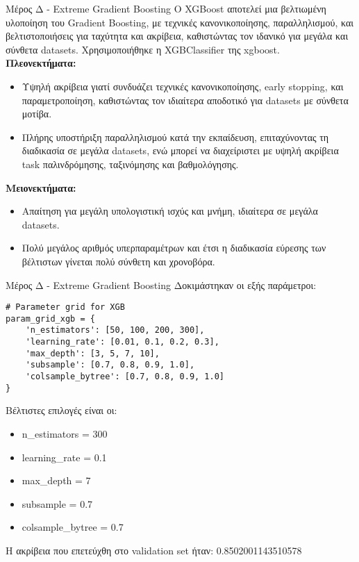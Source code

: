 \documentclass{beamer}
\begin{document}
\begin{frame}[fragile]{Μέρος Δ - Extreme Gradient Boosting}
Ο XGBoost αποτελεί μια βελτιωμένη υλοποίηση του Gradient Boosting, με τεχνικές κανονικοποίησης, παραλληλισμού, και βελτιστοποιήσεις για ταχύτητα και ακρίβεια, καθιστώντας τον ιδανικό για μεγάλα και σύνθετα datasets. Χρησιμοποιήθηκε η XGBClassifier της xgboost.\\
\textbf{Πλεονεκτήματα:}
\begin{itemize}
    \item Υψηλή ακρίβεια γιατί συνδυάζει τεχνικές κανονικοποίησης, early stopping, και παραμετροποίηση, καθιστώντας τον ιδιαίτερα αποδοτικό για datasets με σύνθετα μοτίβα.
    \item Πλήρης υποστήριξη παραλληλισμού κατά την εκπαίδευση, επιταχύνοντας τη διαδικασία σε μεγάλα datasets, ενώ μπορεί να διαχείριστει με υψηλή ακρίβεια task παλινδρόμησης, ταξινόμησης και βαθμολόγησης.
\end{itemize}
\textbf{Μειονεκτήματα:}
\begin{itemize}
    \item Απαίτηση για μεγάλη υπολογιστική ισχύς και μνήμη, ιδιαίτερα σε μεγάλα datasets.
    \item Πολύ μεγάλος αριθμός υπερπαραμέτρων και έτσι η διαδικασία εύρεσης των βέλτιστων γίνεται πολύ σύνθετη και χρονοβόρα.
\end{itemize}
\end{frame}
\begin{frame}[fragile]{Μέρος Δ - Extreme Gradient Boosting}
Δοκιμάστηκαν οι εξής παράμετροι:
\lstset{style=python}
\begin{lstlisting}
# Parameter grid for XGB
param_grid_xgb = {
    'n_estimators': [50, 100, 200, 300],
    'learning_rate': [0.01, 0.1, 0.2, 0.3],
    'max_depth': [3, 5, 7, 10],
    'subsample': [0.7, 0.8, 0.9, 1.0],
    'colsample_bytree': [0.7, 0.8, 0.9, 1.0]
}

\end{lstlisting}

Βέλτιστες επιλογές είναι οι:
\begin{itemize}
    \item n\_estimators = 300
    \item learning\_rate = 0.1
    \item max\_depth = 7
    \item subsample = 0.7
    \item colsample\_bytree = 0.7
\end{itemize}
Η ακρίβεια που επετεύχθη στο validation set ήταν: 0.8502001143510578
\end{frame}
\end{document}
